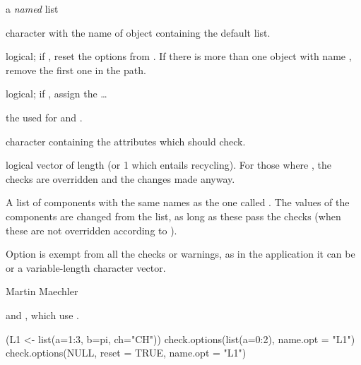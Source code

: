 \begin{Arguments}
\begin{ldescription}
\item[\code{new}] a \emph{named} list
\item[\code{name.opt}] character with the name of \R{} object containing the
default list.
\item[\code{reset}] logical; if , reset the options from
.  If there is more than one \R{} object with name
, remove the first one in the  path.
\item[\code{assign.opt}] logical; if , assign the \ldots
\item[\code{envir}] the  used for 
and .
\item[\code{check.attributes}] character containing the attributes which
 should check.
\item[\code{override.check}] logical vector of length  (or 1
which entails recycling).
For those  where , the
checks are overridden and the changes made anyway.
\end{ldescription}
\end{Arguments}
%
\begin{Value}
A list of components with the same names as the one called
.
The values of the components are changed from the  list,
as long as these pass the checks (when these are not overridden
according to ).
\end{Value}
%
\begin{Note}\relax
Option  is exempt from all the checks or warnings, as in
the application it can be  or a variable-length character
vector.
\end{Note}
%
\begin{Author}\relax
Martin Maechler
\end{Author}
%
\begin{SeeAlso}\relax
{} and ,
which use .
\end{SeeAlso}
%
\begin{Examples}
\begin{ExampleCode}
(L1 <- list(a=1:3, b=pi, ch="CH"))
check.options(list(a=0:2), name.opt = "L1")
check.options(NULL, reset = TRUE, name.opt = "L1")
\end{ExampleCode}
\end{Examples}
